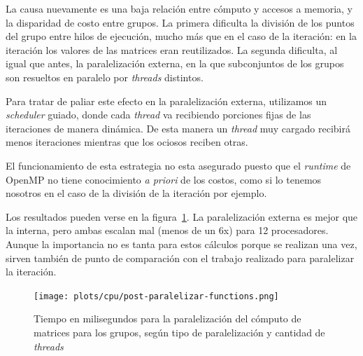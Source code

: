 La causa nuevamente es una baja relaci\'on entre c\'omputo y accesos a memoria,
y la disparidad de costo entre grupos. La primera dificulta la divisi\'on de los
puntos del grupo entre hilos de ejecuci\'on, mucho m\'as que en el caso de la iteraci\'on: en la iteraci\'on los
valores de las matrices eran reutilizados. La segunda dificulta, al igual que antes, la
paralelizaci\'on externa, en la que subconjuntos de los grupos son resueltos
en paralelo por \textit{threads} distintos.

Para tratar de paliar este efecto en la paralelizaci\'on externa, utilizamos un
\textit{scheduler} guiado, donde cada \textit{thread} va recibiendo porciones
fijas de las iteraciones de manera din\'amica. De esta manera un \textit{thread}
muy cargado recibir\'a menos iteraciones mientras que los ociosos reciben otras.

El funcionamiento de esta estrategia no esta asegurado puesto que el \textit{runtime}
de OpenMP no tiene conocimiento \textit{a priori} de los costos, como si lo tenemos
nosotros en el caso de la divisi\'on de la iteraci\'on por ejemplo.

Los resultados pueden verse en la figura~\ref{fig:functions-paralelizado}. La
paralelizaci\'on externa es mejor que la interna, pero ambas escalan mal (menos
de un 6x) para 12 procesadores. Aunque la importancia no es tanta para estos
c\'alculos porque se realizan una vez, sirven tambi\'en de punto de comparaci\'on
con el trabajo realizado para paralelizar la iteraci\'on.

\begin{figure}[htbp]
   \centering
   \texttt{[image: plots/cpu/post-paralelizar-functions.png]}
   \caption{Tiempo en milisegundos para la paralelizaci\'on del c\'omputo
   de matrices para los grupos, seg\'un tipo de paralelizaci\'on y cantidad de
   \textit{threads}}
   \label{fig:functions-paralelizado}
\end{figure}
